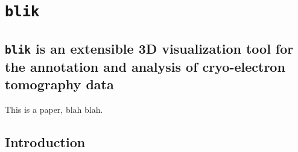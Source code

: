 \chapter{\texttt{blik}}\label{blik_paper}


\section*{\texttt{blik} is an extensible 3D visualization tool for the annotation and analysis of cryo-electron tomography data}

This is a paper, blah blah.

\minitoc

\section{Introduction}
\lipsum[5-9]

